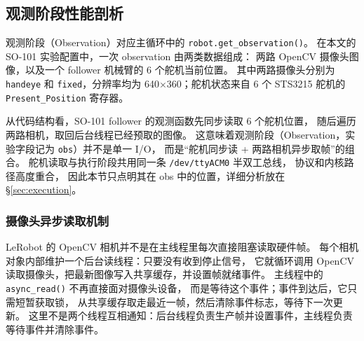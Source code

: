 \subsection{观测阶段性能剖析}\label{sec:observation}

观测阶段（Observation）对应主循环中的 \texttt{robot.get\_observation()}。
在本文的 SO-101 实验配置中，一次 observation 由两类数据组成：
两路 OpenCV 摄像头图像，以及一个 follower 机械臂的 6 个舵机当前位置。
其中两路摄像头分别为 \texttt{handeye} 和 \texttt{fixed}，分辨率均为
640$\times$360；舵机状态来自 6 个 STS3215 舵机的
\texttt{Present\_Position} 寄存器。

从代码结构看，SO-101 follower 的观测函数先同步读取 6 个舵机位置，
随后遍历两路相机，取回后台线程已经预取的图像。
这意味着观测阶段（Observation，实验字段记为 \texttt{obs}）并不是单一 I/O，
而是“舵机同步读 + 两路相机异步取帧”的组合。
舵机读取与执行阶段共用同一条 \texttt{/dev/ttyACM0} 半双工总线，
协议和内核路径高度重合，
因此本节只点明其在 obs 中的位置，详细分析放在 \S\ref{sec:execution}。

\subsubsection{摄像头异步读取机制}

LeRobot 的 OpenCV 相机并不是在主线程里每次直接阻塞读取硬件帧。
每个相机对象内部维护一个后台读线程：只要没有收到停止信号，
它就循环调用 OpenCV 读取摄像头，把最新图像写入共享缓存，并设置帧就绪事件。
主线程中的 \texttt{async\_read()} 不再直接面对摄像头设备，
而是等待这个事件；事件到达后，它只需短暂获取锁，
从共享缓存取走最近一帧，然后清除事件标志，等待下一次更新。
这里不是两个线程互相通知：后台线程负责生产帧并设置事件，主线程负责等待事件并清除事件。

